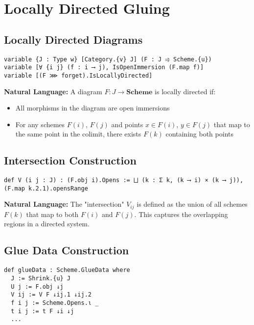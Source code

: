 \documentclass{article}
\theoremstyle{definition}
\begin{document}
\section{Locally Directed Gluing}

\subsection{Locally Directed Diagrams}

\begin{lstlisting}
variable {J : Type w} [Category.{v} J] (F : J ⥤ Scheme.{u})
variable [∀ {i j} (f : i ⟶ j), IsOpenImmersion (F.map f)]
variable [(F ⋙ forget).IsLocallyDirected]
\end{lstlisting}

\textbf{Natural Language:} A diagram $F: J \to \mathbf{Scheme}$ is locally directed if:
\begin{itemize}
\item All morphisms in the diagram are open immersions
\item For any schemes $F(i)$, $F(j)$ and points $x \in F(i)$, $y \in F(j)$ that map to the same point in the colimit, there exists $F(k)$ containing both points
\end{itemize}

\subsection{Intersection Construction}

\begin{lstlisting}
def V (i j : J) : (F.obj i).Opens := ⨆ (k : Σ k, (k ⟶ i) × (k ⟶ j)), (F.map k.2.1).opensRange
\end{lstlisting}

\textbf{Natural Language:} The "intersection" $V_{ij}$ is defined as the union of all schemes $F(k)$ that map to both $F(i)$ and $F(j)$. This captures the overlapping regions in a directed system.

\subsection{Glue Data Construction}

\begin{lstlisting}
def glueData : Scheme.GlueData where
  J := Shrink.{u} J
  U j := F.obj ↓j
  V ij := V F ↓ij.1 ↓ij.2
  f i j := Scheme.Opens.ι _
  t i j := t F ↓i ↓j
  ...
\end{lstlisting}
\end{document}
